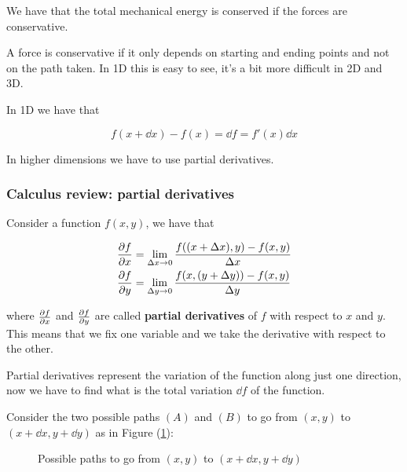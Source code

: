 \documentclass[10pt]{extarticle}
\begin{document}
We have that the total mechanical energy is conserved if the forces are conservative.

A force is conservative if it only depends on starting and ending points and not on the path taken. In 1D this is easy to see, it's a bit more difficult in 2D and 3D.

In 1D we have that

$$
    f(x + \dd{x}) - f(x) = \dd{f} = f'(x) \dd{x}
$$

In higher dimensions we have to use partial derivatives.

\subsubsection{Calculus review: partial derivatives}

Consider a function $f(x, y)$, we have that

\begin{align*}
    \pdv{f}{x} & = \lim_{\Delta x \to 0} \frac{f((x + \Delta x), y) - f(x, y)}{\Delta x} \\
    \pdv{f}{y} & = \lim_{\Delta y \to 0} \frac{f(x, (y + \Delta y)) - f(x, y)}{\Delta y}
\end{align*}

where $\pdv{f}{x}$ and $\pdv{f}{y}$ are called \textbf{partial derivatives} of $f$ with respect to $x$ and $y$.
This means that we fix one variable and we take the derivative with respect to the other.

Partial derivatives represent the variation of the function along just one direction, now we have to find what is the total variation $\dd{f}$ of the function.

Consider the two possible paths $(A)$ and $(B)$ to go from $(x, y)$ to $(x + \dd{x}, y + \dd{y})$ as in Figure (\ref{fig:partial_derivatives}):

\begin{figure}[H]
    \centering

    \caption{Possible paths to go from $(x, y)$ to $(x + \dd{x}, y + \dd{y})$}
    \label{fig:partial_derivatives}
\end{figure}
\end{document}
